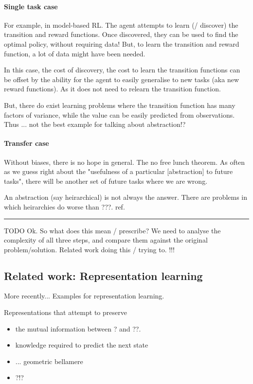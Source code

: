 \paragraph{Single task case}

For example, in model-based RL. The agent attempts to learn (/ discover) the
transition and reward functions. Once discovered, they can be used to find the optimal policy, without requiring data!
But, to learn the transition and reward function, a lot of data might have been needed.

In this case, the cost of discovery, the cost to learn the transition functions can be offset
by the ability for the agent to easily generalise to new tasks (aka new reward functions).
As it does not need to relearn the transition function.

But, there do exist learning problems where the transition function has many
factors of variance, while the value can be easily predicted from observations.
Thus ...
{\color{red}not the best example for talking about abstraction!?}

\paragraph{Transfer case}

Without biases, there is no hope in general. The no free lunch theorem.
As often as we guess right about the "usefulness of a particular [abstraction] to future tasks",
there will be another set of future tasks where we are wrong.

An abstraction (say heirarchical) is not always the answer. There are problems in which
heirarchies do worse than ???. ref.

\begin{center}\rule{0.5\linewidth}{\linethickness}\end{center}

{\color{red}TODO}
Ok. So what does this mean / prescribe?
We need to analyse the complexity of all three steps, and compare them against the
original problem/solution.
Related work doing this / trying to. !!!

\subsection{Related work: Representation learning}

More recently...
Examples for representation learning.

Representations that attempt to preserve
\begin{itemize}
\tightlist
  \item the mutual information between ? and ??.
  \item knowledge required to predict the next state
  \item ... geometric bellamere
  \item ?!?
\end{itemize}
